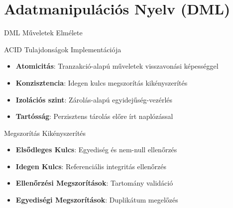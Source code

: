\documentclass[aspectratio=169]{beamer}
\begin{document}
\section{Adatmanipulációs Nyelv (DML)}

\begin{frame}{DML Műveletek Elmélete}
\begin{block}{ACID Tulajdonságok Implementációja}
\begin{itemize}
    \item \textbf{Atomicitás}: Tranzakció-alapú műveletek visszavonási képességgel
    \item \textbf{Konzisztencia}: Idegen kulcs megszorítás kikényszerítés
    \item \textbf{Izolációs szint}: Zárolás-alapú egyidejűség-vezérlés
    \item \textbf{Tartósság}: Perzisztens tárolás előre írt naplózással
\end{itemize}
\end{block}

\begin{block}{Megszorítás Kikényszerítés}
\begin{itemize}
    \item \textbf{Elsődleges Kulcs}: Egyediség és nem-null ellenőrzés
    \item \textbf{Idegen Kulcs}: Referenciális integritás ellenőrzés
    \item \textbf{Ellenőrzési Megszorítások}: Tartomány validáció
    \item \textbf{Egyediségi Megszorítások}: Duplikátum megelőzés
\end{itemize}
\end{block}
\end{frame}
\end{document}
